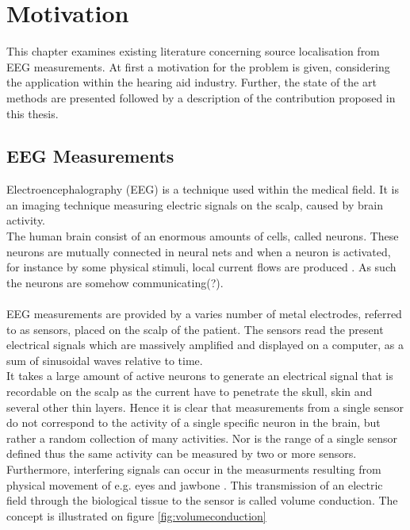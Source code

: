 \chapter{Motivation}
This chapter examines existing literature concerning source localisation from EEG measurements. At first a motivation for the problem is given, considering the application within the hearing aid industry. Further, the state of the art methods are presented followed by a description of the contribution proposed in this thesis. 

\section{EEG Measurements}
Electroencephalography (EEG) is a technique used within the medical field. It is an imaging technique measuring electric signals on the scalp, caused by brain activity. 
\\
The human brain consist of an enormous amounts of cells, called neurons. These neurons are mutually connected in neural nets and when a neuron is activated, for instance by some physical stimuli, local current flows are produced \cite{fundamentalEEG}. As such the neurons are somehow communicating(?). 
\\
\\
EEG measurements are provided by a varies number of metal electrodes, referred to as sensors, placed on the scalp of the patient. The sensors read the present electrical signals which are massively amplified and displayed on a computer, as a sum of sinusoidal waves relative to time.
\\
It takes a large amount of active neurons to generate an electrical signal that is recordable on the scalp as the current have to penetrate the skull, skin and several other thin layers.
Hence it is clear that measurements from a single sensor do not correspond to the activity of a single specific neuron in the brain, but rather a random collection of many activities. Nor is the range of a single sensor defined thus the same activity can be measured by two or more sensors. Furthermore, interfering signals can occur in the measurments resulting from physical movement of e.g. eyes and jawbone \cite{fundamentalEEG}. This transmission of an electric field through the biological tissue to the sensor is called volume conduction. The concept is illustrated on figure \ref{fig:volumeconduction}
\\
\\
